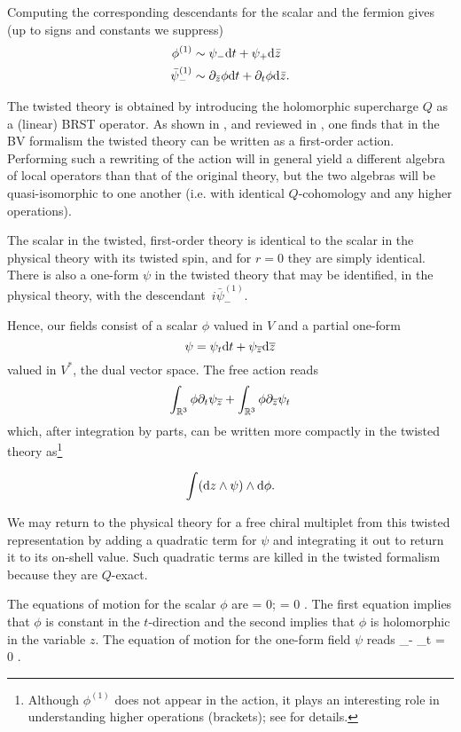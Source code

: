 \documentclass[11pt]{amsart}
\begin{document}
Computing the corresponding descendants for the scalar and the fermion gives (up to signs and constants we suppress)
\begin{align}
\label{eqn:N=2desc1}
\phi^{(1)} &\sim \psi_{-} {\rm d} t + \psi_+ {\rm d} \bar{z} \\
\label{eqn:N=2desc2}
\bar{\psi}_-^{(1)} &\sim \partial_{\bar{z}}\phi {\rm d} t + \partial_t \phi {\rm d} \bar{z}.
\end{align}

The twisted theory is obtained by introducing the holomorphic supercharge $Q$ as a (linear) BRST operator. 
As shown in \cite{ACNV}, and reviewed in \cite{CDG,ESW}, one finds that in the BV formalism the twisted theory can be written as a first-order action.
Performing such a rewriting of the action will in general yield a different algebra of local operators than that of the original theory, but the two algebras will be quasi-isomorphic to one another (i.e. with identical $Q$-cohomology and any higher operations).

The scalar in the twisted, first-order theory is identical to the scalar in the physical theory with its twisted spin, and for $r=0$ they are simply identical. There is also a one-form $\psi$ in the twisted theory that may be identified, in the physical theory, with the descendant~$i \bar{\psi}_-^{(1)}$.

Hence, our fields consist of a scalar $\phi$ valued in $V$ and a partial one-form 
\[
\psi = \psi_t {\rm d} t + \psi_{\overline{z}} {\rm d} {\overline{z}} 
\]
valued in $V^*$, the dual vector space.
The free action reads
\[
\int_{\mathbb R^3} \phi \partial_t \psi_{\overline{z}} + \int_{\mathbb R^3} \phi \partial_{\overline{z}} \psi_t 
\]
which, after integration by parts, can be written more compactly in the twisted theory as\footnote{Although $\phi^{(1)}$ does not appear in the action, it plays an interesting role in understanding higher operations (brackets); see \cite{CDG} for details.}

\[
\int({\rm d} z \wedge \psi) \wedge {\rm d} \phi.
\]

We may return to the physical theory for a free chiral multiplet from this twisted representation by adding a quadratic term for $\psi$ and integrating it out to return it to its on-shell value. 
Such quadratic terms are killed in the twisted formalism because they are $Q$-exact.  

The equations of motion for the scalar $\phi$ are
\beqn\label{eqn:phiEOM}
 \phi = 0; \quad
\frac{\partial}{\partial \zbar} \phi = 0 .
\eeqn
The first equation implies that $\phi$ is constant in the $t$-direction and the second implies that $\phi$ is holomorphic in the variable $z$. 
The equation of motion for the one-form field $\psi$ reads
\beqn\label{eqn:psiEOM}
 \psi_\zbar - \frac{\partial}{\partial \zbar} \psi_t = 0 .
\eeqn
\end{document}
